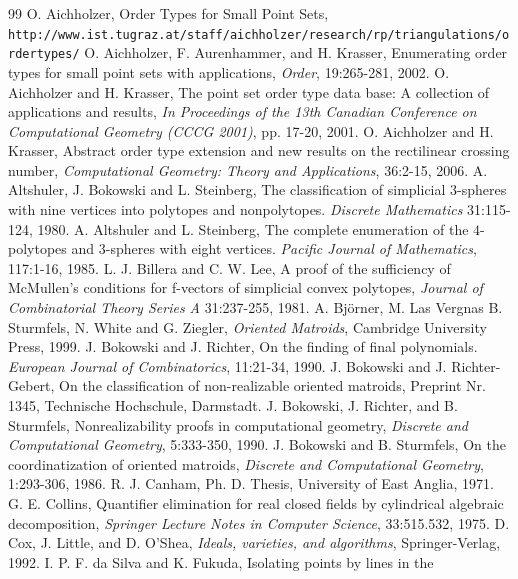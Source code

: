 \documentclass{article}
\begin{document}
\begin{thebibliography}{99}
O. Aichholzer, Order Types for Small Point Sets,\\
{\tt http://www.ist.tugraz.at/staff/aichholzer/research/rp/triangulations/ordertypes/}
O. Aichholzer, F. Aurenhammer, and H. Krasser,
 Enumerating order types for small point sets with applications, {\it Order}, 19:265-281, 2002.
 O. Aichholzer and H. Krasser,
 The point set order type data base: A collection of applications and results,
  {\it In Proceedings of the 13th Canadian Conference on Computational Geometry (CCCG 2001)}, pp. 17-20, 2001.
O. Aichholzer and H. Krasser, Abstract order type extension and new results on the rectilinear crossing number,
 {\it Computational Geometry: Theory and Applications}, 36:2-15, 2006.
 A. Altshuler, J. Bokowski and L. Steinberg,
The classification of simplicial 3-spheres with nine vertices into polytopes and nonpolytopes. {\it Discrete Mathematics} 31:115-124, 1980.
 A. Altshuler and L. Steinberg,
The complete enumeration of the $4$-polytopes and $3$-spheres with eight vertices.
{\it Pacific Journal of Mathematics}, 117:1-16, 1985.
 L. J. Billera and C. W. Lee, A proof of the sufficiency of
 McMullen's conditions for f-vectors of simplicial convex polytopes, 
{\it Journal of Combinatorial Theory Series A} 31:237-255, 1981.
 A. Bj\"orner, M. Las Vergnas B. Sturmfels, N. White and G. Ziegler, {\it Oriented Matroids},
Cambridge University Press, 1999.
 J. Bokowski and J. Richter, On the finding of final polynomials. {\it European Journal
of Combinatorics}, 11:21-34, 1990.
 J. Bokowski and J. Richter-Gebert, On the classification of
non-realizable oriented matroids, Preprint Nr. 1345, Technische
Hochschule, Darmstadt.
J. Bokowski, J. Richter, and B. Sturmfels, Nonrealizability proofs in computational geometry,
 {\it Discrete and Computational Geometry}, 5:333-350, 1990.
 J. Bokowski and B. Sturmfels, On the coordinatization of oriented matroids,
{\it Discrete and Computational Geometry}, 1:293-306, 1986.
R. J. Canham, Ph. D. Thesis, University of East Anglia, 1971.
G. E. Collins, Quantifier elimination for real closed fields by
cylindrical algebraic decomposition, {\it Springer Lecture Notes in
Computer Science}, 33:515.532, 1975.
 D. Cox, J. Little, and D. O'Shea, {\it Ideals, varieties, and algorithms}, 
 Springer-Verlag, 1992.
I. P. F. da Silva and K. Fukuda, Isolating points by lines in the

\end{thebibliography}
\end{document}

